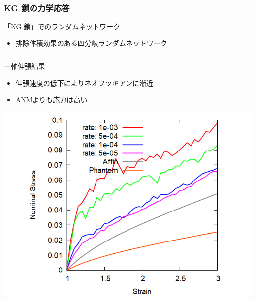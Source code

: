 \documentclass[12pt, dvipdfmx]{beamer}
\begin{document}
						
						
					

\begin{frame}
	\frametitle{KG 鎖の力学応答}
	\begin{alertblock}{「KG 鎖」でのランダムネットワーク}
		\begin{itemize}
			\item 排除体積効果のある四分岐ランダムネットワーク
		\end{itemize}
	\end{alertblock}
	\vspace{-3mm}
		\begin{columns}[T, onlytextwidth]
				\begin{block}{一軸伸張結果}
					\begin{itemize}
						\item 伸張速度の低下によりネオフッキアンに漸近
						\item ANMよりも応力は高い
					\end{itemize}
					\includegraphics[width=\textwidth]{N48_C4_M3.png}
				\end{block}
				

\end{columns}
\end{frame}
\end{document}
